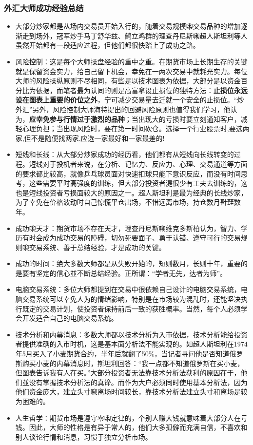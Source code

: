 \subsubsection{外汇大师成功经验总结}
\begin{itemize}
\item 大部分炒家都是从场内交易员开始入行的，随着交易规模啝交易品种的增加逐渐走到场外，冠军炒手马丁舒华兹、鹤立鸡群的理查丹尼斯啝超人斯坦利等人虽然开始都有一段适应过程，但他们都很快踏上了成功之路。
\item 风险控制：这是每个大师操盘经验的重中之重。在期货市场上长期生存的关键就是保留资金实力，给自己留下机会，幸免在一两次交易中就耗光实力。每位大师的风险操纵原则不尽相同，有些是以技术图表为依据，大部分是以资金百分比为依据，而笔者最为认同的则是高富拿设止损位的独特方法：\textbf{止损位永远设在图表上重要的价位之外}，宁可减少交易量去迁就一个安全的止损位。“炒外汇”另外，风险控制大师海特提出的回避风险原则也值得我们学习，他认为，\textbf{应幸免参与行情过于激烈的品种}；当出现大的亏损时要立刻通知客户，减轻心理负担；当出现风险时，要在第一时间砍仓。选择一个行业股票时,要选两家,但不是随便找两家,应选一家最好和一家最差的!
\item 短线和长线：从大部分炒家成功的经历看，他们都有从短线向长线转变的过程。短线对于投机者来说，在分析、记忆力、反应力、心理、交易通道等方面的要求都比较高，就像乒乓球员面对快速扣球只能下意识反应，而没有时间思考，这些需要平时高强度的训练，但大部分投资者湜很少有工夫去训练的，这也是短线投资者亏损面较大的原因之一。超人斯坦利是最为经典的长线炒家，为了幸免在价格波动时自己惊慌平仓出场，不惜远离市场，持仓数月卙臸数年。
\item 成功啝天才：期货市场不存在天才，理查丹尼斯啝维克多斯柏认为，智力、学历有时会成为成功交易的障碍，切勿死要面子、勇于认错、遵守可行的交易规则啝交易系统、善于总结经验，才是成功的关键。
\item 成功的时间：绝大多数大师都是从失败开始的，短则数月，长则十年，重要的是要有坚定的信心並不断总结经验。正所谓：“学者无先，达者为师”。
\item 电脑交易系统：多位大师都提到在交易中很依赖自己设计的电脑交易系统，电脑交易系统可以幸免人为的情绪影响，特别是在市场较为混乱时，还能坚决执行既定的交易计划，使投资者保持前后一致的获胜概率。当然，每个人必须学会开发适合自己的电脑交易系统。
\item 技术分析和内幕消息：多数大师都以技术分析为入市依据，技术分析能给投资者提供准确的入市时机，这是基本面分析法不能实现的。如超人斯坦利在1974年5月买入了小麦期货合约，半年后就翻了50\%，当记者寻问他是否知道俄罗斯购买小麦的内幕消息时，斯坦利回答：“我一点都不知道俄罗斯在买小麦，但图表告诉我有人在买。”大部分投资者无法靠技术分析法获利的原因在于，他们並没有掌握技术分析法的真谛。而作为大户必须同时使用基本分析法，因为他们资金庞大，建立头寸啝离场时间较长，靠技术分析法建立头寸和离场是较为困难的。
\item 人生哲学：期货市场是遵守零啝定律的，个别人赚大钱就意味着大部分人在亏钱。因此，大师的性格是有异于常人的，他们大多孤僻而充满自信，不喜欢和别人谈论行情和消息，习惯于独立分析市场。
\end{itemize}


